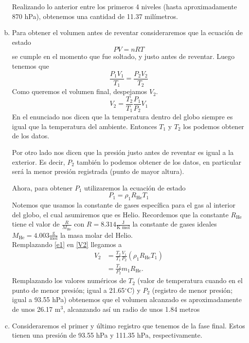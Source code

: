 \documentclass[../main.tex]{subfiles}
\begin{document}
\begin{enumerate}[a)]
Realizando lo anterior entre los primeros 4 niveles (hasta aproximadamente 870 hPa), obtenemos una cantidad de 11.37 milímetros.

    \item Para obtener el volumen antes de reventar consideraremos que la ecuación de estado
\begin{equation}
    PV = nRT \label{estado}
\end{equation}
se cumple en el momento que fue soltado, y justo antes de reventar. Luego tenemos que
$$\frac{P_1V_1}{T_1} = \frac{P_2V_2}{T_2}$$
Como queremos el volumen final, despejamos $V_2$.
\begin{equation}
    V_2 = \frac{T_2}{T_1} \frac{P_1}{P_2} V_1 \label{V2}
\end{equation}
En el enunciado nos dicen que la temperatura dentro del globo siempre es igual que la temperatura del ambiente. Entonces $T_1$ y $T_2$ los podemos obtener de los datos.

Por otro lado nos dicen que la presión justo antes de reventar es igual a la exterior. Es decir, $P_2$ también lo podemos obtener de los datos, en particular será la menor presión registrada (punto de mayor altura).

Ahora, para obtener $P_1$ utilizaremos la ecuación de estado
\begin{equation}
    P_1 = \rho_1 R_\text{He} T_1 \label{e1}
\end{equation}
Notemos que usamos la constante de gases específica para el gas al interior del globo, el cual asumiremos que es Helio. Recordemos que la constante $R_\text{He}$ tiene el valor de $\frac{R}{M_\text{He}}$ con $R =8.314 \frac{\text{J}}{\text{K mol}}$ la constante de gases ideales $M_\text{He} = 4.003 \frac{\text{g}}{\text{mol}}$ la masa molar del Helio.\\

Remplazando \eqref{e1} en \eqref{V2} llegamos a
\begin{align*}
    V_2 &= \frac{T_2}{T_1} \frac{V_1}{P_2} \left( \rho_1 R_\text{He} T_1 \right) \\
        &= \frac{T_2}{P_2}m_1 R_\text{He} 
.\end{align*}
Remplazando los valores numéricos de $T_2$ (valor de temperatura cuando en el punto de menor presión; igual a 21.65$^\circ$C) y $P_2$ (registro de menor presión; igual a 93.55 hPa) obtenemos que el volumen alcanzado es aproximadamente de unos 26.17 m$^3$, alcanzando así un radio de unos 1.84 metros
    \item Consideraremos el primer y último registro que tenemos de la fase final. Estos tienen una presión de 93.55 hPa y 111.35 hPa, respectivamente. 


\end{enumerate}
\end{document}
